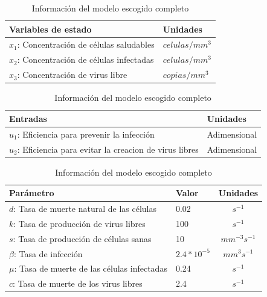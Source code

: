 \documentclass{article}
\begin{document}
    \begin{table}[H]
    \centering
    \begin{tabular}{|p{6cm} p{2.5cm}|}
        \hline
        \textbf{Variables de estado} & \textbf{Unidades} \\
        \hline
        $x_1$: Concentración de células saludables & $celulas / mm^3$\\
        $x_2$: Concentración de células infectadas & $celulas / mm^3$\\
        $x_3$: Concentración de virus libre        & $copias / mm^3$\\
        \hline
    \end{tabular}

    \vspace{0.5cm}

    \begin{tabular}{|p{8cm} p{2.5cm}|}
        \hline
        \textbf{Entradas} & \textbf{Unidades} \\
        \hline
        $u_1$: Eficiencia para prevenir la infección              & Adimensional \\
        $u_2$: Eficiencia para evitar la creacion de virus libres & Adimensional \\
        \hline
    \end{tabular}

    \vspace{0.5cm}

    \begin{tabular}{|p{7cm} p{2cm} c|}
        \hline
        \textbf{Parámetro} & \textbf{Valor} & \textbf{Unidades} \\
        \hline
        $d$: Tasa de muerte natural de las células      & 0.02            & $s^{-1}$\\
        $k$: Tasa de producción de virus libres         & 100             & $s^{-1}$\\
        $s$: Tasa de producción de células sanas        & 10              & $mm^{-3} s^{-1}$\\
        $\beta$: Tasa de infección                      & $2.4 * 10^{-5}$ & $mm^3 s^{-1}$\\
        $\mu$: Tasa de muerte de las células infectadas & 0.24            & $s^{-1}$\\
        $c$: Tasa de muerte de los virus libres         & 2.4             & $s^{-1}$\\
        \hline
    \end{tabular}
    \caption{Información del modelo escogido completo \cite{model}}
    \label{table:modelComplete}
    \end{table}
\end{document}
